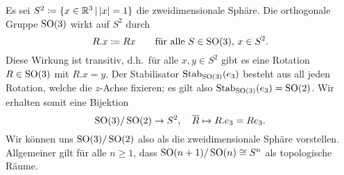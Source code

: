\begin{remark}
  Es sei $S^2 \coloneqq \{ x \in \Real^3 \suchthat \abs{x} = 1 \}$ die zweidimensionale Sphäre.
  Die orthogonale Gruppe $\operatorname{SO}(3)$ wirkt auf $S^2$ durch
  \[
              R.x
    \coloneqq Rx
    \qquad
    \text{für alle $S \in \operatorname{SO}(3)$, $x \in S^2$}.
  \]
  Diese Wirkung ist transitiv, d.h.\ für alle $x, y \in S^2$ gibt es eine Rotation $R \in \operatorname{SO}(3)$ mit $R.x = y$.
  Der Stabilisator $\operatorname{Stab}_{\operatorname{SO}(3)}(e_3)$ besteht aus all jeden Rotation, welche die $z$-Achse fixieren;
  es gilt also $\operatorname{Stab}_{\operatorname{SO}(3)}(e_3) = \operatorname{SO}(2)$.
  Wir erhalten somit eine Bijektion
  \[
            \operatorname{SO}(3)/\operatorname{SO}(2)
    \to     S^2,
    \quad   \overline{R}
    \mapsto R.e_3
    =       R e_3.
  \]
  Wir können uns $\operatorname{SO}(3)/\operatorname{SO}(2)$ also als die zweidimensionale Sphäre vorstellen.
  Allgemeiner gilt für alle $n \geq 1$, dass $\operatorname{SO}(n+1)/\operatorname{SO}(n) \cong S^n$ als topologische Räume.
\end{remark}





\subsection{}

